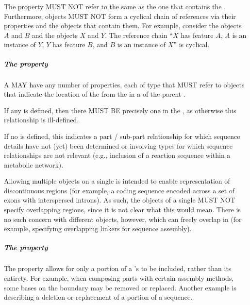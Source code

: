 The  property MUST NOT refer to the same  as the one that contains the .
Furthermore,  objects MUST NOT form a cyclical chain of references via their  properties and the  objects that contain them.
For example, consider the  objects $A$ and $B$ and the  objects $X$ and $Y$. The reference chain ``$X$ has feature $A$, $A$ is an instance of $Y$, $Y$ has feature $B$, and $B$ is an instance of $X$'' is cyclical.


\subparagraph{The  property}\label{sec:hasLocation:SC}

A  MAY have any number of  properties, each of type  that MUST refer to  objects that indicate the location of the  from the   in a  of the parent .

If any  is defined, then there MUST BE precisely one  in the  , as otherwise this relationship is ill-defined.

If no  is defined, this indicates a part / sub-part relationship for which sequence details have not (yet) been determined or involving types for which sequence relationships are not relevant (e.g., inclusion of a reaction sequence within a metabolic network).

Allowing multiple  objects on a single  is intended to enable representation of discontinuous regions (for example, a coding sequence encoded across a set of exons with interspersed introns).
As such, the  objects of a single  MUST NOT specify overlapping regions, since it is not clear what this would mean.
There is no such concern with different objects, however, which can freely overlap in  (for example, specifying overlapping linkers for sequence assembly).


\subparagraph{The  property}\label{sec:sourceLocation}

The  property allows for only a portion of a 's  to be included, rather than its entirety.
For example, when composing parts with certain assembly methods, some bases on the boundary may be removed or replaced.
Another example is describing a deletion or replacement of a portion of a sequence.

